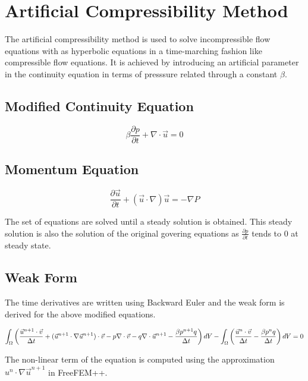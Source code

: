 \documentclass{article}
\newcommand{\Vol}{\rotatebox[origin=c]{180}{\ensuremath{A}}}
\begin{document}
\section{Artificial Compressibility Method}
The artificial compressibility method is used to solve incompressible flow
equations with as hyperbolic equations in a time-marching fashion like compressible
flow equations. It is achieved by introducing an artificial parameter in the continuity
equation in terms of presssure related through a constant $\beta$.

\subsection*{Modified Continuity Equation}
$$\beta \frac{\partial{p}}{\partial{t}} + \nabla \cdot \vec{u}  = 0$$

\subsection*{Momentum Equation}
$$ \frac{\partial{\vec{u}}}{\partial{t}} + (\vec{u} \cdot \nabla) \vec{u} = - \nabla P $$

\noindent The set of equations are solved until a steady solution is obtained. This steady solution
is also the solution of the original govering equations as $\frac{\partial{p}}{\partial{t}}$ tends
to 0 at steady state.\\

\subsection*{Weak Form}
The time derivatives are written using Backward Euler and the weak form is derived
for the above modified equations.

$$\int_{\Omega} \left( \frac{\vec{u}^{n+1}\cdot\vec{v}}{\Delta t} + (\vec{u}^{n+1} \cdot \nabla\vec{u}^{n+1})\cdot\vec{v} - p\nabla \cdot\vec{v} - q\nabla \cdot \vec{u}^{n+1}
    - \frac{\beta p^{n+1} q}{\Delta t}\right) d\Vol - \int_{\Omega} \left(\frac{\vec{u}^{n}\cdot\vec{v}}{\Delta t} - \frac{\beta p^{n} q}{\Delta t}\right) d\Vol = 0$$

\noindent The non-linear term of the equation is computed using the approximation $u^n \cdot \nabla\vec{u}^{n+1}$ in FreeFEM++.
\end{document}
